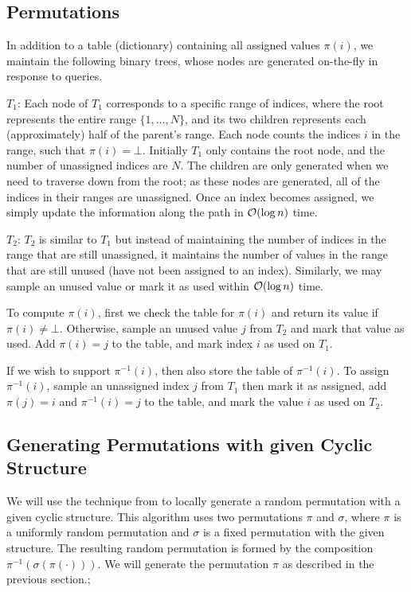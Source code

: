 \subsection{Permutations}

In addition to a table (dictionary) containing all assigned values $\pi(i)$, we maintain the following binary trees,
whose nodes are generated on-the-fly in response to queries.

$T_1$: Each node of $T_1$ corresponds to a specific range of indices,
where the root represents the entire range $\{1, \ldots, N\}$,
and its two children represents each (approximately) half of the parent's range.
Each node counts the indices $i$ in the range, such that $\pi(i) = \bot$.
Initially $T_1$ only contains the root node, and the number of unassigned indices are $N$.
The children are only generated when we need to traverse down from the root; as these nodes are generated,
all of the indices in their ranges are unassigned.
Once an index becomes assigned, we simply update the information along the path in $\Bo(\log n)$ time.

$T_2$: $T_2$ is similar to $T_1$ but instead of maintaining the number of indices in the range that are still unassigned,
it maintains the number of values in the range that are still unused (have not been assigned to an index).
Similarly, we may sample an unused value or mark it as used within $\Bo(\log n)$ time.

To compute $\pi(i)$, first we check the table for $\pi(i)$ and return its value if $\pi(i)\neq\bot$.
Otherwise, sample an unused value $j$ from $T_2$ and mark that value as used.
Add $\pi(i) = j$ to the table, and mark index $i$ as used on $T_1$.

If we wish to support $\pi^{-1}(i)$, then also store the table of $\pi^{-1}(i)$.
To assign $\pi^{-1}(i)$, sample an unassigned index $j$ from $T_1$ then mark it as assigned,
add $\pi(j)=i$ and $\pi^{-1}(i)=j$ to the table, and mark the value $i$ as used on $T_2$.

\subsection{Generating Permutations with given Cyclic Structure}
We will use the technique from \cite{cyclic} to locally generate a random permutation with a given cyclic structure.
This algorithm uses two permutations $\pi$ and $\sigma$,
where $\pi$ is a uniformly random permutation and $\sigma$ is a fixed permutation with the given structure.
The resulting random permutation is formed by the composition $\pi^{-1}(\sigma(\pi(\cdot)))$.
We will generate the permutation $\pi$ as described in the previous section.;



